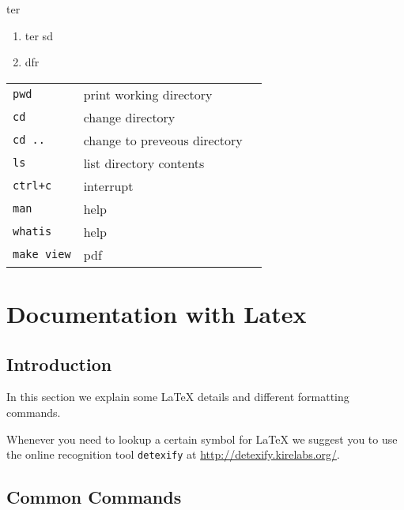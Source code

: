 \documentclass[10pt,a4paper]{scrartcl}
\begin{document}
\begin{description}
\item{ter}
\begin{enumerate}
\item{ter} sd
\item dfr
\end{enumerate}

\begin{tabular}{lll}
\verb$pwd$ &{\rm print working directory}\\
\verb$cd$ &{\rm change directory}\\
\verb$cd ..$ &{change to preveous directory}\\
\verb$ls$ &{\rm list directory contents}\\
\verb$ctrl+c$ &{interrupt}\\
\verb$man$ &{help}\\
\verb$whatis$ &{help}\\
\verb$make view$ & {\rm pdf}\\
\end{tabular}

\end{description}

\section{Documentation with Latex}
\subsection{Introduction} 

In this section we explain some \LaTeX\xspace details and different formatting
commands.

Whenever you need to lookup a certain symbol for \LaTeX\xspace we suggest you to use
the online recognition tool \texttt{detexify} at \url{http://detexify.kirelabs.org/}.


\subsection{Common Commands}
\end{document}

